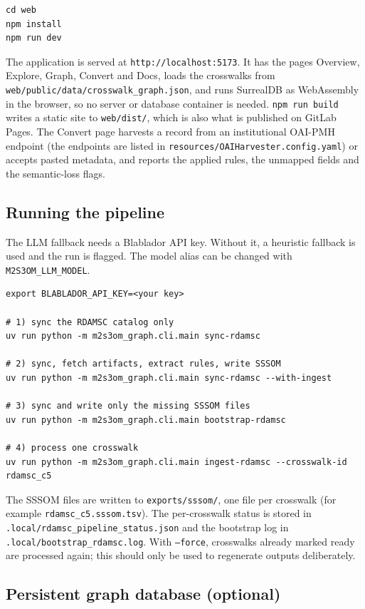 \documentclass[10pt,twocolumn,a4paper]{extarticle}
\begin{document}
\begin{lstlisting}
cd web
npm install
npm run dev
\end{lstlisting}

The application is served at \texttt{http://localhost:5173}. It has the pages
Overview, Explore, Graph, Convert and Docs, loads the crosswalks from
\texttt{web/public/data/crosswalk\_graph.json}, and runs SurrealDB as
WebAssembly in the browser, so no server or database container is needed.
\texttt{npm run build} writes a static site to \texttt{web/dist/}, which is
also what is published on GitLab Pages. The Convert page harvests a record
from an institutional OAI-PMH endpoint (the endpoints are listed in
\texttt{resources/OAIHarvester.config.yaml}) or accepts pasted metadata, and
reports the applied rules, the unmapped fields and the semantic-loss flags.

\subsection{Running the pipeline}

The LLM fallback needs a Blablador API key. Without it, a heuristic
fallback is used and the run is flagged. The model alias can be changed with
\texttt{M2S3OM\_LLM\_MODEL}.

\begin{lstlisting}
export BLABLADOR_API_KEY=<your key>

# 1) sync the RDAMSC catalog only
uv run python -m m2s3om_graph.cli.main sync-rdamsc

# 2) sync, fetch artifacts, extract rules, write SSSOM
uv run python -m m2s3om_graph.cli.main sync-rdamsc --with-ingest

# 3) sync and write only the missing SSSOM files
uv run python -m m2s3om_graph.cli.main bootstrap-rdamsc

# 4) process one crosswalk
uv run python -m m2s3om_graph.cli.main ingest-rdamsc --crosswalk-id rdamsc_c5
\end{lstlisting}

The SSSOM files are written to \texttt{exports/sssom/}, one file per
crosswalk (for example \texttt{rdamsc\_c5.sssom.tsv}). The per-crosswalk
status is stored in \texttt{.local/rdamsc\_pipeline\_status.json} and the
bootstrap log in \texttt{.local/bootstrap\_rdamsc.log}. With
\texttt{--force}, crosswalks already marked ready are processed again; this
should only be used to regenerate outputs deliberately.

\subsection{Persistent graph database (optional)}\label{app:db}
\end{document}
